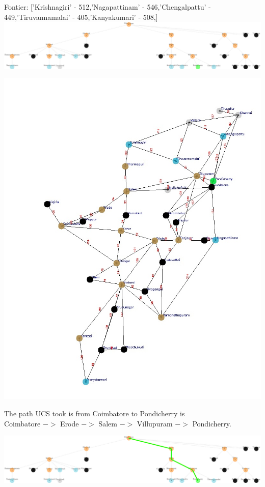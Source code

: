 \documentclass[xcolor=table]{beamer}
\begin{document}
\begin{frame}
  { \tiny Fontier: ['Krishnagiri' - 512,'Nagapattinam' - 546,'Chengalpattu' - 449,'Tiruvannamalai' - 405,'Kanyakumari' - 508,]}
   \includegraphics[width=1\textwidth]{../UCSNodes/38-1.png}
  \begin{center}
    \includegraphics[height=0.6\textheight]{../UCSoutput/tamilUCS39.jpg}
  \end{center}
\end{frame}
\begin{frame}
  \quad The path UCS took is from Coimbatore to Pondicherry is\\
  Coimbatore $->$ Erode $->$ Salem $->$ Villupuram $->$ Pondicherry.
  \begin{center}
    \includegraphics[width=1\textwidth]{../UCSNodes/UCSFINAL-1.png}
  \end{center}
\end{frame}
\end{document}
